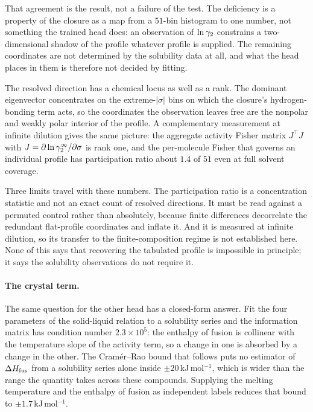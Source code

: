 That agreement is the result, not a failure of the test. The deficiency is a property of the
closure as a map from a $51$-bin histogram to one number, not something the trained head does: an
observation of $\ln\gamma_2$ constrains a two-dimensional shadow of the profile whatever profile is
supplied. The remaining coordinates are not determined by the solubility data at all, and what the
head places in them is therefore not decided by fitting.

The resolved direction has a chemical locus as well as a rank. The dominant eigenvector
concentrates on the extreme-$|\sigma|$ bins on which the closure's hydrogen-bonding term acts, so
the coordinates the observation leaves free are the nonpolar and weakly polar interior of the
profile. A complementary measurement at infinite dilution gives the same picture: the aggregate
activity Fisher matrix $J^{\top}J$ with $J=\partial\ln\gamma_2^\infty/\partial\sigma$ is rank one, and the
per-molecule Fisher that governs an individual profile has participation ratio about $1.4$ of $51$
even at full solvent coverage.

Three limits travel with these numbers. The participation ratio is a concentration statistic and
not an exact count of resolved directions. It must be read against a permuted control rather than
absolutely, because finite differences decorrelate the redundant flat-profile coordinates and
inflate it. And it is measured at infinite dilution, so its transfer to the finite-composition
regime is not established here. None of this says that recovering the tabulated profile is
impossible in principle; it says the solubility observations do not require it.

\paragraph{The crystal term.}
The same question for the other head has a closed-form answer. Fit the four parameters of the
solid-liquid relation to a solubility series and the information matrix has condition number
$2.3\times10^{5}$: the enthalpy of fusion is collinear with the temperature slope of the activity
term, so a change in one is absorbed by a change in the other. The Cram\'er--Rao bound that follows
puts no estimator of $\Delta H_{\mathrm{fus}}$ from a solubility series alone inside $\pm20$\,kJ\,mol$^{-1}$, which
is wider than the range the quantity takes across these compounds. Supplying the melting
temperature and the enthalpy of fusion as independent labels reduces that bound to
$\pm1.7$\,kJ\,mol$^{-1}$.

